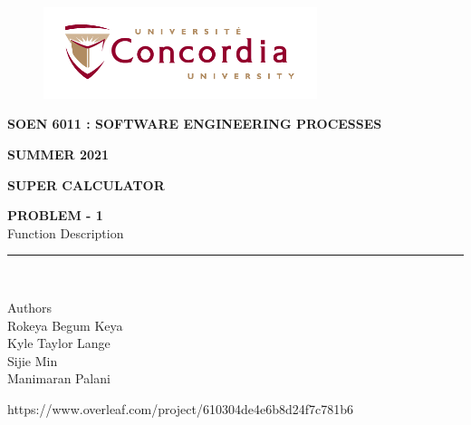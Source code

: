\documentclass[a4paper, 11pt]{report}
\begin{document}
\begin{titlepage}
\vspace*{0.7in}
\begin{center}
\begin{figure}[htb]
\begin{center}
\includegraphics[width=8cm]{univ_logo}
\end{center}
\end{figure}
\vspace*{0.3in}
\begin{Large}
\textbf{SOEN 6011 : SOFTWARE ENGINEERING PROCESSES} \\
\end{Large}
\vspace*{0.1in}
\begin{Large}
\textbf{SUMMER 2021} \\
\end{Large}
\vspace*{0.9in}
\begin{Large}
\textbf{SUPER CALCULATOR} \\
\end{Large}
\vspace*{0.9in}
\begin{Large}
\textbf{PROBLEM - 1} \\
Function Description \\
\end{Large}
\vspace*{0.9in}
\rule{80mm}{0.1mm}\\
\vspace*{0.1in}
\begin{large}
Authors \\
\vspace*{0.1in}
Rokeya Begum Keya\\
\vspace*{0.1in}
Kyle Taylor Lange\\
\vspace*{0.1in}
Sijie Min\\
\vspace*{0.1in}
Manimaran Palani\\ 
\vspace*{0.3in}
\date{\normalsize\today} 
\end{large}
\end{center}
\begin{center}
https://www.overleaf.com/project/610304de4e6b8d24f7c781b6\end{center}
\end{titlepage}
\tableofcontents
\newpage
{}
\end{document}
